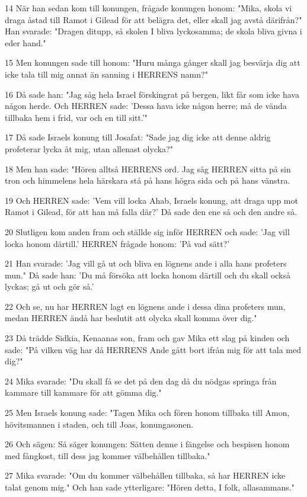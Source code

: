 \par 14 När han sedan kom till konungen, frågade konungen honom: "Mika, skola vi draga åstad till Ramot i Gilead för att belägra det, eller skall jag avstå därifrån?" Han svarade: "Dragen ditupp, så skolen I bliva lyckosamma; de skola bliva givna i eder hand."
\par 15 Men konungen sade till honom: "Huru många gånger skall jag besvärja dig att icke tala till mig annat än sanning i HERRENS namn?"
\par 16 Då sade han: "Jag såg hela Israel förskingrat på bergen, likt får som icke hava någon herde. Och HERREN sade: 'Dessa hava icke någon herre; må de vända tillbaka hem i frid, var och en till sitt.'"
\par 17 Då sade Israels konung till Josafat: "Sade jag dig icke att denne aldrig profeterar lycka åt mig, utan allenast olycka?"
\par 18 Men han sade: "Hören alltså HERRENS ord. Jag såg HERREN sitta på sin tron och himmelens hela härskara stå på hans högra sida och på hans vänstra.
\par 19 Och HERREN sade: 'Vem vill locka Ahab, Israels konung, att draga upp mot Ramot i Gilead, för att han må falla där?' Då sade den ene så och den andre så.
\par 20 Slutligen kom anden fram och ställde sig inför HERREN och sade: 'Jag vill locka honom därtill.' HERREN frågade honom: 'På vad sätt?'
\par 21 Han svarade: 'Jag vill gå ut och bliva en lögnens ande i alla hans profeters mun." Då sade han: 'Du må försöka att locka honom därtill och du skall också lyckas; gå ut och gör så.'
\par 22 Och se, nu har HERREN lagt en lögnens ande i dessa dina profeters mun, medan HERREN ändå har beslutit att olycka skall komma över dig."
\par 23 Då trädde Sidkia, Kenaanas son, fram och gav Mika ett slag på kinden och sade: "På vilken väg har då HERRENS Ande gått bort ifrån mig för att tala med dig?"
\par 24 Mika svarade: "Du skall få se det på den dag då du nödgas springa från kammare till kammare för att gömma dig."
\par 25 Men Israels konung sade: "Tagen Mika och fören honom tillbaka till Amon, hövitsmannen i staden, och till Joas, konungasonen.
\par 26 Och sägen: Så säger konungen: Sätten denne i fängelse och bespisen honom med fångkost, till dess jag kommer välbehållen tillbaka."
\par 27 Mika svarade: "Om du kommer välbehållen tillbaka, så har HERREN icke talat genom mig." Och han sade ytterligare: "Hören detta, I folk, allasammans."
